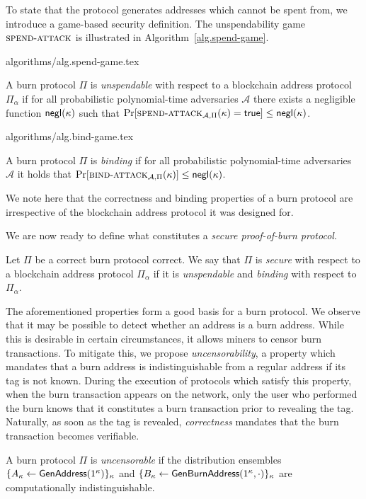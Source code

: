 To state that the protocol generates addresses which cannot be spent from, we introduce a game-based security definition. The unspendability game $\textsc{spend}\-\text{-}\-\textsc{attack}$ is illustrated in Algorithm~\ref{alg.spend-game}.

{algorithms/alg.spend-game.tex}

\begin{definition}[Unspendability]
  A burn protocol $\Pi$ is \emph{unspendable} with respect to a blockchain address protocol $\Pi_\alpha$ if
  for all probabilistic polynomial-time adversaries $\mathcal{A}$ there exists a negligible function $\textsf{negl}(\kappa)$ such that
  $
    \Pr[\textsc{spend}\-\text{-}\-\textsc{attack}_{\mathcal{A}, \Pi}(\kappa) = \textsf{true}] \leq \textsf{negl}(\kappa)
  $.
\end{definition}

{algorithms/alg.bind-game.tex}

\begin{definition}[Binding]
  A burn protocol $\Pi$ is \emph{binding} if
  for all probabilistic polynomial-time adversaries $\mathcal{A}$ it holds that $\Pr[\textsc{bind}\-\text{-}\-\textsc{attack}_{\mathcal{A},\Pi}(\kappa)] \leq \textsf{negl}(\kappa)$.
\end{definition}

We note here that the correctness and binding properties of a burn protocol are irrespective of the blockchain address protocol it was designed for.

We are now ready to define what constitutes a \emph{secure proof-of-burn protocol}.

\begin{definition}[Security]
  Let $\Pi$ be a correct burn protocol correct. We say that $\Pi$ is \emph{secure} with respect to a blockchain address protocol $\Pi_\alpha$ if it is \emph{unspendable} and \emph{binding} with respect to $\Pi_\alpha$.
\end{definition}

The aforementioned properties form a good basis for a burn protocol. We observe that it may be possible to detect whether an address is a burn address. While this is desirable in certain circumstances, it allows miners to censor burn transactions. To mitigate this, we propose \emph{uncensorability}, a property which mandates that a burn address is indistinguishable from a regular address if its tag is not known. During the execution of protocols which satisfy this property, when the burn transaction appears on the network, only the user who performed the burn knows that it constitutes a burn transaction prior to revealing the tag. Naturally, as soon as the tag is revealed, \emph{correctness} mandates that the burn transaction becomes verifiable.

\begin{definition}[Uncensorability]
  A burn protocol $\Pi$ is \emph{uncensorable} if
  the distribution ensembles $\{A_\kappa \gets \mathsf{GenAddress}(1^\kappa)\}_\kappa$ and
  $\{B_\kappa \gets \mathsf{Gen}\-\mathsf{Burn}\-\mathsf{Address}(1^\kappa, \cdot)\}_\kappa$ are computationally indistinguishable.
\end{definition}
